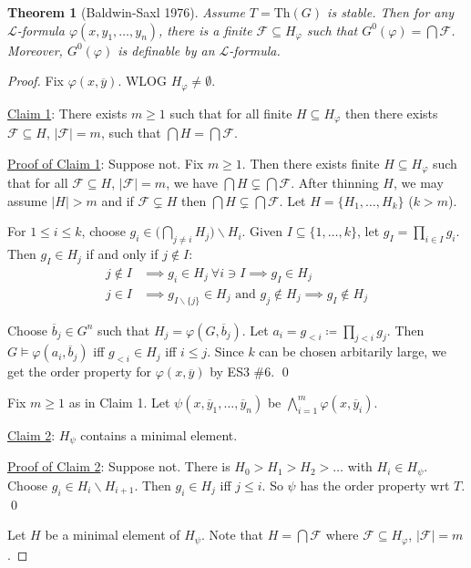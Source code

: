 \documentclass[]{article}
\theoremstyle{custhm}
\newtheorem{theorem}{Theorem}[section]
\theoremstyle{cusdef}
\theoremstyle{custhm}
\theoremstyle{custhm}
\theoremstyle{custhm}
\theoremstyle{ex}
\theoremstyle{custhm}
\theoremstyle{cusdef}
\theoremstyle{remark}
\theoremstyle{remark}
\theoremstyle{numremark}
\renewcommand{\L}{\mathcal{L}}
\renewcommand{\phi}{\varphi}
\renewcommand{\bar}{\overline}
\newcommand{\Th}{\textrm{Th}}
\begin{document}
\begin{theorem}[Baldwin-Saxl 1976]
	Assume $T = \Th(G)$ is stable. Then for any $\L$-formula $\phi(x,y_1,\dots,y_n)$, there is a finite $\mathcal{F}\subseteq H_\phi$ such that $G^{0}(\phi) = \bigcap \mathcal{F}$. Moreover, $G^0(\phi)$ is definable by an $\L$-formula.
\end{theorem}
\begin{proof}
	Fix $\phi(x,\bar{y})$. WLOG $H_\phi \ne \emptyset$.

	\underline{Claim 1}: There exists $m\ge 1$ such that for all finite $H\subseteq H_\phi$ then there exists $\mathcal{F}\subseteq H$, $|\mathcal{F}| = m$, such that $\bigcap H = \bigcap \mathcal{F}$.

	\underline{Proof of Claim 1}: Suppose not. Fix $m\ge 1$. Then there exists finite $H\subseteq H_\phi$ such that for all $\mathcal{F}\subseteq H$, $|\mathcal{F}| = m$, we have $\bigcap H\subsetneq \bigcap \mathcal{F}$. After thinning $H$, we may assume $|H| > m$ and if $\mathcal{F}\subsetneq H$ then $\bigcap H\subsetneq \bigcap \mathcal{F}$. Let $H = \{H_1,\dots,H_k\}$ ($k>m$).

	For $1\le i \le k$, choose $g_i \in \big(\bigcap_{j\ne i}H_j\big)\backslash H_i$. Given $I \subseteq \{1,\dots,k\}$, let $g_I = \prod_{i\in I}g_i$. Then $g_I \in H_j$ if and only if $j\not\in I$:
	\begin{align*}
		j\not\in I &\implies g_i \in H_j\ \forall i\ni I \implies g_I\in H_j\\
		j\in I &\implies g_{I\backslash\{j\}}\in H_j\textrm{ and }g_j\not\in H_j\implies g_I\not\in H_j
	\end{align*}

	Choose $\bar{b}_j\in G^n$ such that $H_j = \phi(G,\bar{b}_j)$. Let $a_i = g_{<i}\coloneqq \prod_{j<i}g_j$. Then $G\models \phi(a_i,\bar{b}_j)$ iff $g_{<i}\in H_j$ iff $i\le j$. Since $k$ can be chosen arbitarily large, we get the order property for $\phi(x,\bar{y})$ by ES3 \#6. \qed

	Fix $m\ge 1$ as in Claim 1. Let $\psi(x,\bar{y}_1,\dots,\bar{y}_n)$ be $\bigwedge_{i=1}^{m}\phi(x,\bar{y}_i)$.

	\underline{Claim 2}: $H_\psi$ contains a minimal element.

	\underline{Proof of Claim 2}: Suppose not. There is $H_0 > H_1 > H_2 >\dots$ with $H_i \in H_\psi$. Choose $g_i \in H_i\backslash H_{i+1}$. Then $g_i \in H_j$ iff $j \le i$. So $\psi$ has the order property wrt $T$. \qed

	Let $H$ be a minimal element of $H_\psi$. Note that $H = \bigcap \mathcal{F}$ where $\mathcal{F}\subseteq H_\phi$, $|\mathcal{F}| = m$.


\end{proof}
\end{document}
